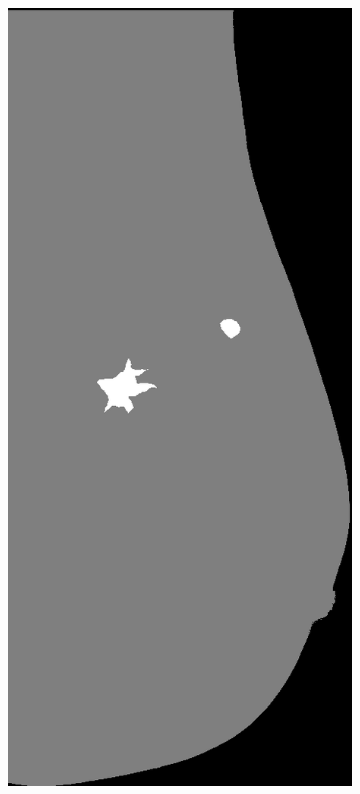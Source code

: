 \documentclass{beamer}
\begin{document}
\begin{frame}
\begin{figure}
\begin{subfigure}{0.134\textwidth}
            \end{subfigure}
            \begin{subfigure}{0.134\textwidth}
	            \centering
		            \includegraphics[width=\textwidth]{plots/examples/label_4.png}

\end{subfigure}
\end{figure}
\end{frame}
\end{document}
